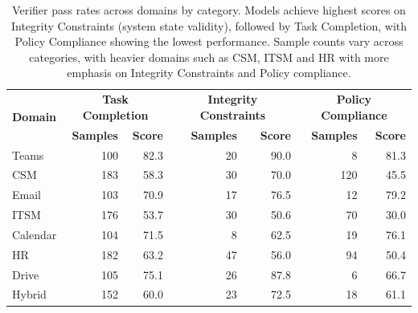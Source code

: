 \begin{table}[htbp]
\centering
\begin{tabular}{l|rr|rr|rr}
\hline
\multirow{2}{*}{\textbf{Domain}} & \multicolumn{2}{c|}{\textbf{Task Completion}} & \multicolumn{2}{c|}{\textbf{Integrity Constraints}} & \multicolumn{2}{c}{\textbf{Policy Compliance}} \\
& \textbf{Samples} & \textbf{Score} & \textbf{Samples} & \textbf{Score} & \textbf{Samples} & \textbf{Score} \\
\hline
Teams    & 100 & 82.3 & 20 & 90.0 & 8   & 81.3 \\
CSM      & 183 & 58.3 & 30 & 70.0 & 120 & 45.5 \\
Email    & 103 & 70.9 & 17 & 76.5 & 12  & 79.2 \\
ITSM     & 176 & 53.7 & 30 & 50.6 & 70  & 30.0 \\
Calendar & 104 & 71.5 & 8  & 62.5 & 19  & 76.1 \\
HR       & 182 & 63.2 & 47 & 56.0 & 94  & 50.4 \\
Drive    & 105 & 75.1 & 26 & 87.8 & 6   & 66.7 \\
Hybrid   & 152 & 60.0 & 23 & 72.5 & 18  & 61.1 \\
\hline
\end{tabular}
\caption{Verifier pass rates across domains by category. Models achieve highest scores on Integrity Constraints (system state validity), followed by Task Completion, with Policy Compliance showing the lowest performance. Sample counts vary across categories, with heavier domains such as CSM, ITSM and HR with more emphasis on Integrity Constraints and Policy compliance.}
\label{tab:verifier_analysis}
\end{table}